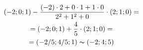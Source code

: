 \documentclass[12pt]{article}
\begin{document}
\begin{gather}
	(-2; 0; 1) - \frac{(-2) \cdot 2 + 0 \cdot 1 + 1 \cdot 0}{2^2 + 1^2 + 0} \cdot (2; 1; 0) = \\
	= (-2; 0; 1) + \frac{4}{5} \cdot (2; 1; 0) = \\
	= (-2/5; 4/5; 1) \thicksim (-2; 4; 5)
\end{gather}

\begin{comment}
\begin{gather}
	\begin{pmatrix}
	\end{pmatrix}
\end{gather}

\begin{gather}
\end{gather}
\end{comment}
\end{document}
